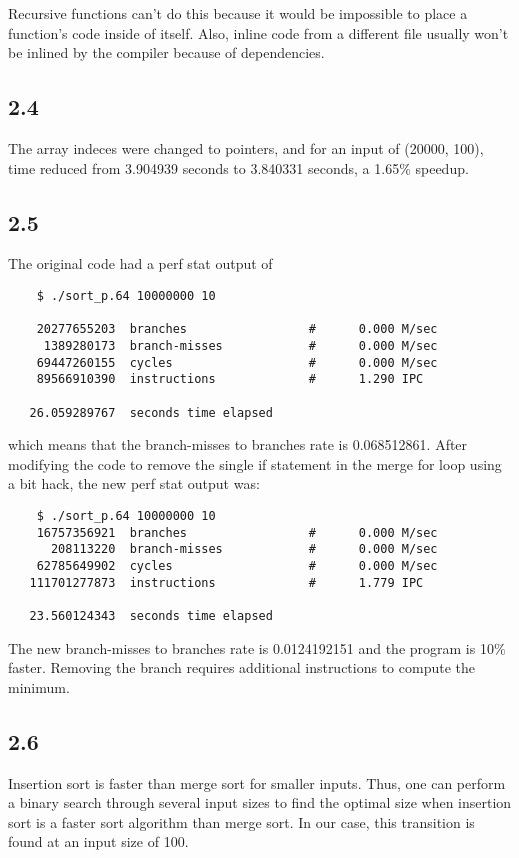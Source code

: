 \documentclass[12pt]{article}
\begin{document}
Recursive functions can't do this because it would be impossible to place a 
function's code inside of itself.  Also, inline code from a different file 
usually won't be inlined by the compiler because of dependencies.  

\subsection{2.4}
The array indeces were changed to pointers, and for an input of (20000, 100), time reduced from 3.904939 seconds
to 3.840331 seconds, a 1.65\% speedup.

\subsection{2.5}
The original code had a perf stat output of 
\begin{verbatim}
    $ ./sort_p.64 10000000 10

    20277655203  branches                 #      0.000 M/sec
     1389280173  branch-misses            #      0.000 M/sec
    69447260155  cycles                   #      0.000 M/sec
    89566910390  instructions             #      1.290 IPC  

   26.059289767  seconds time elapsed
\end{verbatim}
which means that the branch-misses to branches rate is 0.068512861.  After 
modifying the code to remove the single if statement in the merge for loop 
using a bit hack, the new perf stat output was:
\begin{verbatim}
    $ ./sort_p.64 10000000 10
    16757356921  branches                 #      0.000 M/sec
      208113220  branch-misses            #      0.000 M/sec
    62785649902  cycles                   #      0.000 M/sec
   111701277873  instructions             #      1.779 IPC

   23.560124343  seconds time elapsed
\end{verbatim}
The new branch-misses to branches rate is 0.0124192151 and the program is 10\% 
faster. Removing the branch requires additional instructions to compute the minimum. 

\subsection{2.6}
Insertion sort is faster than merge sort for smaller inputs. Thus, one can perform a binary search through
several input sizes to find the optimal size when insertion sort is a faster sort algorithm than merge sort.
In our case, this transition is found at an input size of 100.
\end{document}

